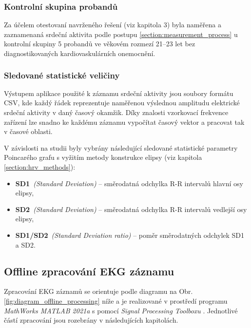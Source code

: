 \subsubsection{Kontrolní skupina probandů}
\label{section:probands}
Za účelem otestovaní navrženého řešení (viz kapitola 3) byla naměřena a
zaznamenaná srdeční aktivita podle postupu \ref{section:measurement_process} u
kontrolní skupiny 5 probandů ve věkovém rozmezí 21--23 let bez diagnostikovaných
kardiovaskulárních onemocnění.

\subsubsection{Sledované statistické veličiny}
\label{section:selected_stats_vals}
Výstupem aplikace použité k záznamu srdeční aktivity jsou soubory formátu CSV,
kde každý řádek reprezentuje naměřenou výslednou amplitudu elektrické srdeční
aktivity v daný časový okamžik. Díky znalosti vzorkovací frekvence zařízení lze
snadno ke každému záznamu vypočítat časový vektor a pracovat tak v časové
oblasti.

V závislosti na studii byly vybrány následující sledované statistické parametry
Poincarého grafu s vyžitím metody konstrukce elipsy (viz kapitola
\ref{section:hrv_methods}):
\begin{itemize}[noitemsep]
    \item \textbf{SD1}~\textit{(Standard Deviation)} -- směrodatná odchylka R-R
          intervalů hlavní osy elipsy,
    \item \textbf{SD2}~\textit{(Standard Deviation)} -- směrodatná odchylka R-R
          intervalů vedlejší osy elipsy,
    \item \textbf{SD1/SD2}~\textit{(Standard Deviation ratio)} -- poměr směrodatných odchylek SD1 a SD2.
\end{itemize}

\subsection{Offline zpracování EKG záznamu}
\label{section:offline_processing}
Zpracování EKG záznamů se orientuje podle diagramu na Obr.
\ref{fig:diagram_offline_processing} níže a je realizované v prostředí programu
\textit{MathWorks MATLAB 2021a} \cite{MATLAB} s pomocí \textit{Signal Processing
    Toolboxu} \text{} \cite{matlabSPT}. Jednotlivé částí zpracování jsou rozebrány v
následujících kapitolách.

